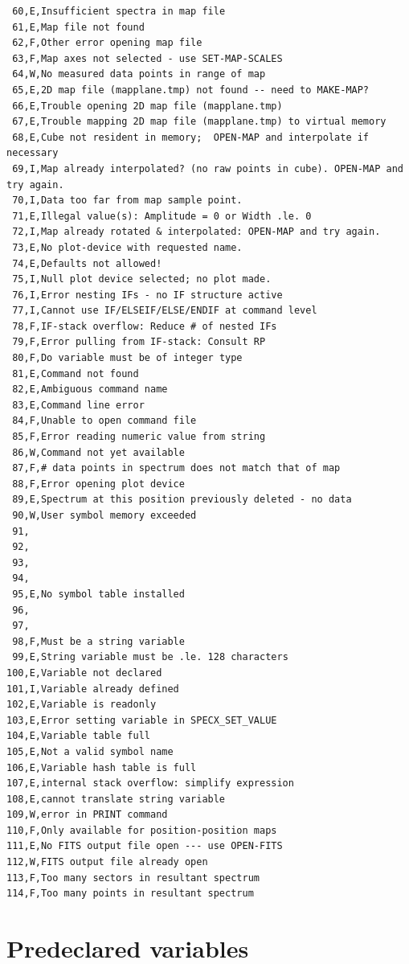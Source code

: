 \documentclass[11pt,twoside]{report}
\begin{document}
\begin{verbatim}
 60,E,Insufficient spectra in map file
 61,E,Map file not found
 62,F,Other error opening map file
 63,F,Map axes not selected - use SET-MAP-SCALES
 64,W,No measured data points in range of map
 65,E,2D map file (mapplane.tmp) not found -- need to MAKE-MAP?
 66,E,Trouble opening 2D map file (mapplane.tmp)
 67,E,Trouble mapping 2D map file (mapplane.tmp) to virtual memory
 68,E,Cube not resident in memory;  OPEN-MAP and interpolate if necessary
 69,I,Map already interpolated? (no raw points in cube). OPEN-MAP and try again.
 70,I,Data too far from map sample point.
 71,E,Illegal value(s): Amplitude = 0 or Width .le. 0
 72,I,Map already rotated & interpolated: OPEN-MAP and try again.
 73,E,No plot-device with requested name.
 74,E,Defaults not allowed!
 75,I,Null plot device selected; no plot made.
 76,I,Error nesting IFs - no IF structure active
 77,I,Cannot use IF/ELSEIF/ELSE/ENDIF at command level
 78,F,IF-stack overflow: Reduce # of nested IFs
 79,F,Error pulling from IF-stack: Consult RP
 80,F,Do variable must be of integer type
 81,E,Command not found
 82,E,Ambiguous command name
 83,E,Command line error
 84,F,Unable to open command file
 85,F,Error reading numeric value from string
 86,W,Command not yet available
 87,F,# data points in spectrum does not match that of map
 88,F,Error opening plot device
 89,E,Spectrum at this position previously deleted - no data
 90,W,User symbol memory exceeded
 91,
 92,
 93,
 94,
 95,E,No symbol table installed
 96,
 97,
 98,F,Must be a string variable
 99,E,String variable must be .le. 128 characters
100,E,Variable not declared
101,I,Variable already defined
102,E,Variable is readonly
103,E,Error setting variable in SPECX_SET_VALUE
104,E,Variable table full
105,E,Not a valid symbol name
106,E,Variable hash table is full
107,E,internal stack overflow: simplify expression
108,E,cannot translate string variable
109,W,error in PRINT command
110,F,Only available for position-position maps
111,E,No FITS output file open --- use OPEN-FITS
112,W,FITS output file already open
113,F,Too many sectors in resultant spectrum
114,F,Too many points in resultant spectrum
\end{verbatim}

\newpage
\chapter{Predeclared variables} 
\end{document}
